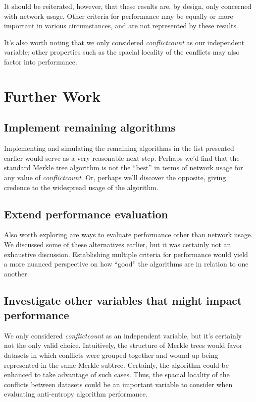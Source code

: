 \documentclass[11pt,letterpaper]{article}
\begin{document}
It should be reiterated, however, that these results are, by design, only concerned with network usage. Other criteria for performance may be equally or more important in various circumstances, and are not represented by these results.

It's also worth noting that we only considered \textit{conflictcount} as our independent variable; other properties such as the spacial locality of the conflicts may also factor into performance.

\section{Further Work}
\subsection{Implement remaining algorithms}
Implementing and simulating the remaining algorithms in the list presented earlier would serve as a very reasonable next step. Perhaps we'd find that the standard Merkle tree algorithm is not the ``best'' in terms of network usage for any value of \textit{conflictcount}. Or, perhaps we'll discover the opposite, giving credence to the widespread usage of the algorithm.

\subsection{Extend performance evaluation}
Also worth exploring are ways to evaluate performance other than network usage. We discussed some of these alternatives earlier, but it was certainly not an exhaustive discussion. Establishing multiple criteria for performance would yield a more nuanced perspective on how ``good'' the algorithms are in relation to one another.

\subsection{Investigate other variables that might impact performance}
We only considered \textit{conflictcount} as an independent variable, but it's certainly not the only valid choice. Intuitively, the structure of Merkle trees would favor datasets in which conflicts were grouped together and wound up being represented in the same Merkle subtree. Certainly, the algorithm could be enhanced to take advantage of such cases. Thus, the spacial locality of the conflicts between datasets could be an important variable to consider when evaluating anti-entropy algorithm performance.

\newpage 

 

\end{document}
